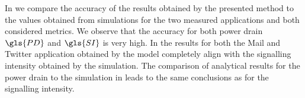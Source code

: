In  we compare the accuracy of the results  obtained by the presented method to the values obtained from simulations for the two measured applications and both considered metrics.
We observe that the accuracy for both power drain \(\gls{PD}\) and \(\gls{SI}\) is very high.
In  the results for both the Mail and Twitter application obtained by the model completely align with the signalling intensity obtained by the simulation.
The comparison of analytical results for the power drain to the simulation in  leads to the same conclusions as for the signalling intensity.

